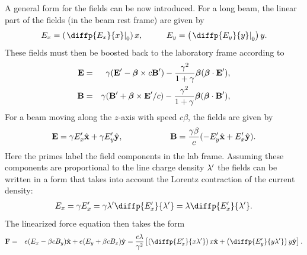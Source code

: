 A general form for the fields can be now introduced. For a long beam, the linear
part of the fields (in the beam rest frame) are given by
%
\begin{eqnarray}
E_x=\left( \left.\diffp{E_x}{x}\right|_{0}\right)x,\hspace{1cm}E_y= \left(\left.\diffp{E_y}{y}\right|_{0}\right)y.
\end{eqnarray}
%
These fields must then be boosted back to the laboratory frame according to
%
\begin{eqnarray}
\textbf{E}&=&\gamma(\textbf{E}\primed-\vec{\mathbf{\beta}}\times
c\textbf{B}\primed)-\frac{\gamma^2}{1+\gamma}\vec{\beta}(\vec{\beta}\cdot
\textbf{E}\primed),\nonumber
\\
\textbf{B}&=&\gamma(\textbf{B}\primed+\vec{\mathbf{\beta}}\times
\textbf{E}\primed/c)-\frac{\gamma^2}{1+\gamma}\vec{\beta}(\vec{\beta}\cdot
\textbf{B}\primed),\label{eq:FieldTrans}
\end{eqnarray}
%
For a beam moving along the $z$-axis with speed $c\beta$, the fields are given by
%
\begin{eqnarray}
\mathbf{E} = \gamma E_x\primed\hat{\mathbf{x}} + \gamma E_y\primed\hat{\mathbf{y}}, \hspace{2cm}
\mathbf{B} = \frac{\gamma\beta}{c}(-E_y\primed\hat{\mathbf{x}} + E_x\primed\hat{\mathbf{y}}).
\end{eqnarray}
%
Here the primes label the field components in the lab frame. Assuming these
components are proportional to the line charge density $\lambda^{\prime}$ the
fields can be written in a form that takes into account the Lorentz contraction
of the current density:
%
\begin{eqnarray}
E_x = \gamma E_x\primed = \gamma\lambda\primed\diffp{E_x\primed}{\lambda\primed}=\lambda\diffp{E_x\primed}{\lambda\primed}.
\end{eqnarray}
%
The linearized force equation then takes the form
%
\begin{eqnarray}
\mathbf{F} &=& e(E_x-\beta c B_{y})\hat{\mathbf{x}} + e(E_y + \beta c B_{x})\hat{\mathbf{y}}
\nonumber
  = \frac{e\lambda}{\gamma^2}
 \left[
 \left(\diffp{E_x\primed}{{x}{\lambda\primed}}\right) x \hat{\mathbf{x}}+
 \left(\diffp{E_y\primed}{{y}{\lambda\primed}}\right) y \hat{\mathbf{y}}
\right].
\end{eqnarray}
